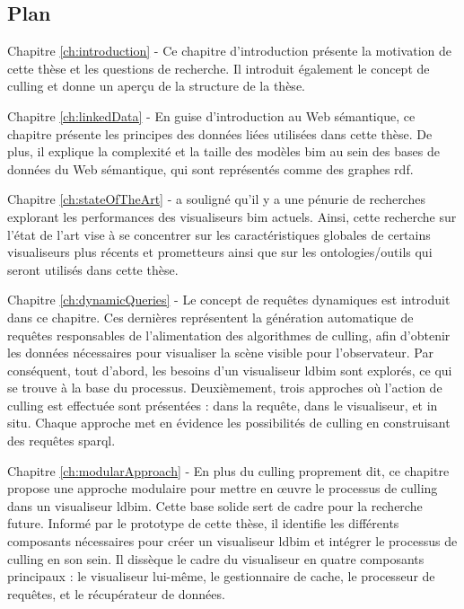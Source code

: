 \begin{refsection}
\begin{multicols}{2}
        \subsection*{Plan}
        \textsf{Chapitre \ref{ch:introduction} -}
        Ce chapitre d'introduction présente la motivation de cette thèse et les questions de recherche. Il introduit également le concept de culling et donne un aperçu de la structure de la thèse.

        \textsf{Chapitre \ref{ch:linkedData} -}
        En guise d'introduction au Web sémantique, ce chapitre présente les principes des données liées utilisées dans cette thèse. De plus, il explique la complexité et la taille des modèles \ac{bim} au sein des bases de données du Web sémantique, qui sont représentés comme des graphes \ac{rdf}.

        \textsf{Chapitre \ref{ch:stateOfTheArt} -}
        \cite{Johansson2015} a souligné qu'il y a une pénurie de recherches explorant les performances des visualiseurs \ac{bim} actuels. Ainsi, cette recherche sur l'état de l'art vise à se concentrer sur les caractéristiques globales de certains visualiseurs plus récents et prometteurs ainsi que sur les ontologies/outils qui seront utilisés dans cette thèse.

        \textsf{Chapitre \ref{ch:dynamicQueries} -}
        Le concept de requêtes dynamiques est introduit dans ce chapitre. Ces dernières représentent la génération automatique de requêtes responsables de l'alimentation des algorithmes de culling, afin d'obtenir les données nécessaires pour visualiser la scène visible pour l'observateur. Par conséquent, tout d'abord, les besoins d'un visualiseur \ac{ldbim} sont explorés, ce qui se trouve à la base du processus. Deuxièmement, trois approches où l'action de culling est effectuée sont présentées : dans la requête, dans le visualiseur, et in situ. Chaque approche met en évidence les possibilités de culling en construisant des requêtes \ac{sparql}.

        \textsf{Chapitre \ref{ch:modularApproach} -}
        En plus du culling proprement dit, ce chapitre propose une approche modulaire pour mettre en œuvre le processus de culling dans un visualiseur \ac{ldbim}. Cette base solide sert de cadre pour la recherche future. Informé par le prototype de cette thèse, il identifie les différents composants nécessaires pour créer un visualiseur \ac{ldbim} et intégrer le processus de culling en son sein. Il dissèque le cadre du visualiseur en quatre composants principaux : le visualiseur lui-même, le gestionnaire de cache, le processeur de requêtes, et le récupérateur de données.


\end{multicols}
\end{refsection}

